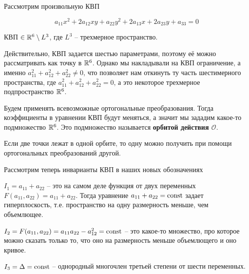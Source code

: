 
Рассмотрим произвольную КВП

\[a_{11} x^2 + 2a_{12}xy + a_{22}y^2 + 2a_{13}x + 2a_{23}y + a_{33} = 0\]

\begin{Prop}
	КВП $\in \mathbb{R}^6 \setminus L^3$, где $L^3$ -- трехмерное пространство. 

	Действительно, КВП задается шестью параметрами, поэтому её можно рассматривать как точку в $\mathbb{R}^6$.
	Однако мы накладывали на КВП ограничение, а именно $a_{11}^2 + a_{12}^2 + a_{22}^2 \neq 0$, что позволяет нам откинуть ту часть шестимерного пространства, где $a_{11}^2 + a_{12}^2 + a_{22}^2 = 0$, 
	а это некоторое трехмерное подпространство $\mathbb{R}^6$.
\end{Prop}

\begin{Def}
	Будем применять всевозможные ортогональные преобразования. Тогда коэффициенты в уравнении КВП будут меняться, а значит мы зададим какое-то подмножество $\mathbb{R}^6$.
	Это подмножество называется \textbf{орбитой действия $\mathcal{O}$}.
\end{Def}

\begin{Rem}
	Если две точки лежат в одной орбите, то одну можно получить при помощи ортогональных преобразований другой.
\end{Rem}

Рассмотрим теперь инварианты КВП в наших новых обозначениях

\begin{MyItemize}
	\item $I_1 = a_{11} + a_{22}$ -- это на самом деле функция от двух переменных $F(a_{11}, a_{22}) = a_{11} + a_{22}$. Тогда уравнение $a_{11} + a_{22} = \operatorname{const}$ задает гиперплоскость, 
	т.е. пространство на одну размерность меньше, чем объемлющее.

	\item $I_2 = F(a_{11}, a_{22}) = a_{11} a_{22} - a_{12}^2 = \operatorname{const}$ -- это какое-то множество, про которое можно сказать только то, что оно на размерность меньше объемлющего и оно кривое.
	\item $I_3 = \Delta = \operatorname{const}$ -- однородный многочлен третьей степени от шести переменных.
\end{MyItemize}

\begin{figure}[h]
	\centering
	\def\svgwidth{.35\columnwidth}
	
\end{figure}

